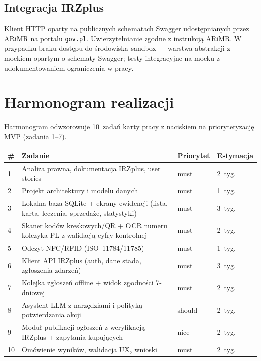 \documentclass[11pt,a4paper]{article}
\begin{document}
\subsection{Integracja IRZplus}

Klient HTTP oparty na publicznych schematach Swagger udostępnianych przez ARiMR na portalu \texttt{gov.pl}. Uwierzytelnianie zgodne z instrukcją ARiMR. W przypadku braku dostępu do środowiska sandbox --- warstwa abstrakcji z mockiem opartym o schematy Swagger; testy integracyjne na mocku z udokumentowaniem ograniczenia w pracy.

\section{Harmonogram realizacji}
\label{sec:harmonogram}

Harmonogram odwzorowuje 10~zadań karty pracy z naciskiem na priorytetyzację MVP (zadania 1--7).

\begin{longtable}{p{0.6cm}p{8.5cm}p{2cm}p{2.5cm}}
\toprule
\textbf{\#} & \textbf{Zadanie} & \textbf{Priorytet} & \textbf{Estymacja} \\
\midrule
\endhead
1 & Analiza prawna, dokumentacja IRZplus, user stories & must & 2~tyg. \\
2 & Projekt architektury i modelu danych & must & 1~tyg. \\
3 & Lokalna baza SQLite + ekrany ewidencji (lista, karta, leczenia, sprzedaże, statystyki) & must & 3~tyg. \\
4 & Skaner kodów kreskowych/QR + OCR numeru kolczyka PL z walidacją cyfry kontrolnej & must & 2~tyg. \\
5 & Odczyt NFC/RFID (ISO~11784/11785) & must & 1~tyg. \\
6 & Klient API IRZplus (auth, dane stada, zgłoszenia zdarzeń) & must & 3~tyg. \\
7 & Kolejka zgłoszeń offline + widok zgodności 7-dniowej & must & 2~tyg. \\
8 & Asystent LLM z narzędziami i polityką potwierdzania akcji & should & 2~tyg. \\
9 & Moduł publikacji ogłoszeń z weryfikacją IRZplus + zapytania kupujących & nice & 2~tyg. \\
10 & Omówienie wyników, walidacja UX, wnioski & must & 2~tyg. \\
\bottomrule
\end{longtable}
\end{document}
